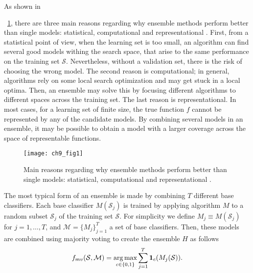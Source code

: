 As shown in \figurename{~\ref{fig:9:1}, there are three main reasons regarding why ensemble 
methods perform better than single models: statistical, computational and representational 
\citep{Dietterich2000a}. First, from a statistical point of view, when the learning set is too 
small, an algorithm can find several good models withing the search space, that arise to the same 
performance on the training set $\mathcal{S}$. Nevertheless, without a validation set, there is 
the risk of choosing the wrong model. The second reason is computational; in general, algorithms 
rely on some local search optimization and may get stuck in a local optima. Then, an ensemble may 
solve this by focusing different algorithms to different spaces across the training set. The last 
reason is representational. In most cases, for a learning set of finite size, the  true function 
$f$ cannot be represented by any of the candidate models. By combining several  models in an 
ensemble, it may be possible to obtain a model with a larger coverage across the  space of 
representable functions.
  
\begin{figure}[t!]
\texttt{[image: ch9\_fig1]}
\caption{Main reasons regarding why ensemble methods perform better than 
  single models: statistical, computational and representational \citep{Dietterich2000a}.}
\label{fig:9:1}
\end{figure} 
  
  The most typical form of an ensemble is made by combining $T$ different base classifiers.
  Each  base classifier $M(\mathcal{S}_j)$ is trained by applying algorithm $M$ to a random subset 
  $\mathcal{S}_j$ of the training set $\mathcal{S}$.  %
  For simplicity we define $M_j \equiv  M(\mathcal{S}_j)$ for $j=1,\dots,T$, and 
  $\mathcal{M}=\{M_j\}_{j=1}^{T}$ a set of base classifiers.
  Then, these models are combined using majority voting to create the ensemble $H$ as follows
  \begin{align}\label{eq:9:majority-vote}
    f_{mv}(\mathcal{S},\mathcal{M}) = \operatorname*{arg\,max}_{c \in \{0,1\}} \sum_{j=1}^T 
    \mathbf{1}_c(M_j(\mathcal{S})).
  \end{align}

}
